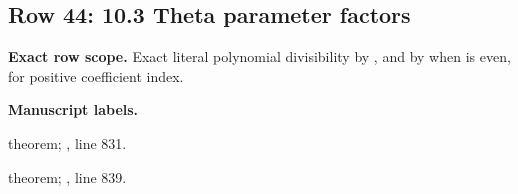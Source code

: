 \subsection{Row 44: 10.3 Theta parameter factors}
\label{row:44}
\textbf{Exact row scope.} Exact literal polynomial divisibility by , and by  when  is even, for positive coefficient index.\par\smallskip
\textbf{Manuscript labels.} \par\smallskip
{\small{}\par}
{\footnotesize\color{muted}theorem; , line 831.\par}\smallskip
{\small{}\par}
{\footnotesize\color{muted}theorem; , line 839.\par}\smallskip
{}
